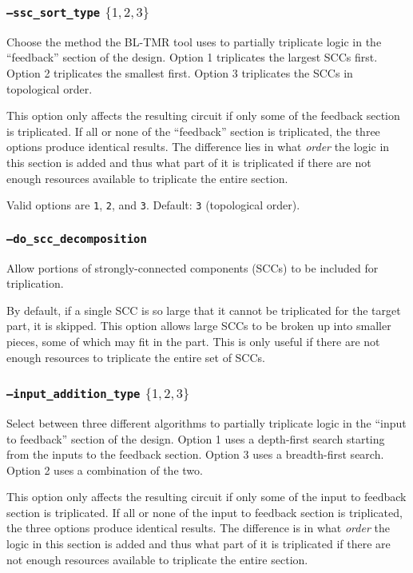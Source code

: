 \subsubsection{\texttt{--ssc\_sort\_type} $\{1,2,3\}$}
Choose the method the BL-TMR tool uses to partially triplicate logic in the 
``feedback'' section of the design.  Option 1 triplicates the largest SCCs 
first. Option 2 triplicates the smallest first. Option 3 triplicates the SCCs 
in topological order.

This option only affects the resulting circuit if only some of the feedback 
section is triplicated. If all or none of the ``feedback'' section is 
triplicated, the three options produce identical results. The difference lies 
in what \emph{order} the logic in this section is added and thus what part of 
it is triplicated if there are not enough resources available to triplicate the 
entire section.

Valid options are \texttt{1}, \texttt{2}, and \texttt{3}. Default: \texttt{3}
(topological order).

\subsubsection{\texttt{--do\_scc\_decomposition}}
Allow portions of strongly-connected components (SCCs) to be included for 
triplication. 

By default, if a single SCC is so large that it cannot be triplicated for the 
target part, it is skipped. This option allows large SCCs to be broken up into 
smaller pieces, some of which may fit in the part. This is only useful if there 
are not enough resources to triplicate the entire set of SCCs.

\subsubsection{\texttt{--input\_addition\_type} $\{1,2,3\}$}
Select between three different algorithms to partially triplicate logic in the 
``input to feedback'' section of the design. Option 1 uses a depth-first search 
starting from the inputs to the feedback section. Option 3 uses a breadth-first 
search. Option 2 uses a combination of the two.

This option only affects the resulting circuit if only some of the input
to feedback section is triplicated. If all or none of the input to feedback 
section is triplicated, the three options produce identical results. The 
difference is in what \emph{order} the logic in this section is added and thus 
what part of it is triplicated if there are not enough resources available to 
triplicate the entire section.

